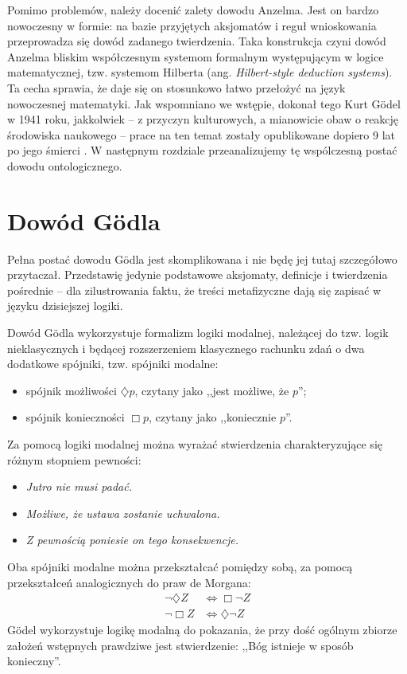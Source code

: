 \documentclass[runningheads]{llncs}
\begin{document}
Pomimo problemów, należy docenić zalety dowodu Anzelma. Jest on bardzo nowoczesny w formie: na bazie przyjętych aksjomatów i reguł wnioskowania przeprowadza się dowód zadanego twierdzenia. Taka konstrukcja czyni dowód Anzelma bliskim współczesnym systemom formalnym występującym w logice matematycznej, tzw. systemom Hilberta (ang. \textit{Hilbert-style deduction systems}). Ta cecha sprawia, że daje się on stosunkowo łatwo przełożyć na język nowoczesnej matematyki. Jak wspomniano we wstępie, dokonał tego Kurt G\"odel w 1941 roku, jakkolwiek -- z przyczyn kulturowych, a mianowicie obaw o reakcję środowiska naukowego -- prace na ten temat zostały opublikowane dopiero 9 lat po jego śmierci \cite{goedel1995}. W następnym rozdziale przeanalizujemy tę wspólczesną postać dowodu ontologicznego. 

\section{Dowód G\"odla}
Pełna postać dowodu G\"odla jest skomplikowana i nie będę jej tutaj szczegółowo przytaczał. Przedstawię jedynie podstawowe aksjomaty, definicje i twierdzenia pośrednie -- dla zilustrowania faktu, że treści metafizyczne dają się zapisać w języku dzisiejszej logiki. 

Dowód G\"odla wykorzystuje formalizm logiki modalnej, należącej do tzw. logik nieklasycznych i będącej rozszerzeniem klasycznego rachunku zdań o dwa dodatkowe spójniki, tzw. spójniki modalne: 
\begin{itemize}
	\item spójnik możliwości $\diamondsuit p$, czytany jako ,,jest możliwe, że $p$'';
	\item spójnik konieczności $\Box p$, czytany jako ,,koniecznie $p$''.
\end{itemize} 
Za pomocą logiki modalnej można wyrażać stwierdzenia charakteryzujące się różnym stopniem pewności: 
\begin{itemize}
	\item \emph{Jutro nie musi padać.}
	\item \emph{Możliwe, że ustawa zostanie uchwalona.}
	\item \emph{Z pewnością poniesie on tego konsekwencje.}
\end{itemize}
Oba spójniki modalne można przekształcać pomiędzy sobą, za pomocą przekształceń analogicznych do praw de Morgana:
\begin{align*}
\neg \diamondsuit Z & \Leftrightarrow \Box \neg Z \\ 
\neg \Box Z & \Leftrightarrow \diamondsuit \neg Z
\end{align*}
G\"odel wykorzystuje logikę modalną do pokazania, że przy dość ogólnym zbiorze założeń wstępnych prawdziwe jest stwierdzenie: ,,Bóg istnieje w sposób konieczny''. 
\end{document}
